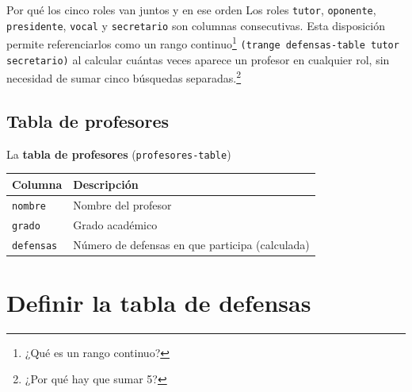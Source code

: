 \documentclass[12pt,a4paper]{report}
\begin{document}
\begin{infobox}{Por qué los cinco roles van juntos y en ese orden}
  Los roles \texttt{tutor}, \texttt{oponente}, \texttt{presidente},
  \texttt{vocal} y \texttt{secretario} son columnas consecutivas.
  Esta disposición permite referenciarlos como {un rango
    continuo}\footnote{¿Qué es un rango continuo?} {\texttt{(trange defensas-table tutor
      secretario)}} {al calcular cuántas veces aparece un
    profesor en cualquier rol}, sin necesidad de {sumar cinco
  búsquedas separadas.}\footnote{¿Por qué hay que sumar 5?}
\end{infobox}



\subsection{Tabla de profesores}

La \textbf{tabla de profesores} (\texttt{profesores-table}) 

\begin{center}
\begin{tabular}{ll}
\toprule
\textbf{Columna}   & \textbf{Descripción} \\
\midrule
\texttt{nombre}    & Nombre del profesor \\
\texttt{grado}     & Grado académico \\
\texttt{defensas}  & Número de defensas en que participa (calculada) \\
\bottomrule
\end{tabular}
\end{center}



\section{Definir la tabla de defensas}
\label{sec:defensas-table}

\end{document}
